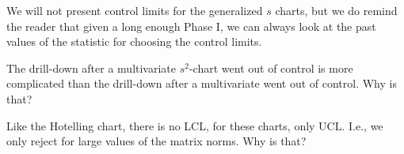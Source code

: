  
We will not present control limits for the generalized $s$ charts, but we do remind the reader that given a long enough Phase I, we can always look at the past values of the statistic for choosing the control limits. 


\begin{think}
	The drill-down after a multivariate $s^2$-chart went out of control is more complicated than the drill-down after a multivariate \barxChart went out of control. 
	Why is that?
\end{think}


\begin{think}
	Like the Hotelling chart, there is no LCL, for these charts, only UCL. 
	I.e., we only reject for large values of the matrix norms. 
	Why is that?
\end{think}

